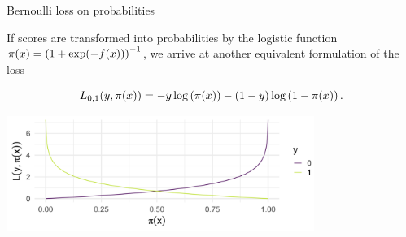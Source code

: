 \begin{vbframe}{Bernoulli loss on probabilities}

If scores are transformed into probabilities by the logistic function  $\pi(x) = \left(1 + \exp(- f(x))\right)^{-1}$, we arrive at another equivalent formulation of the loss

  $$
    L_{0,1}(y, \pi(x)) = - y \log \left(\pi(x)\right) - (1 - y) \log \left(1 - \pi(x)\right). 
  $$

\begin{center}
\includegraphics[width = 10cm ]{figure_man/bernoulli-loss.png} \\
\end{center}

\end{vbframe}



